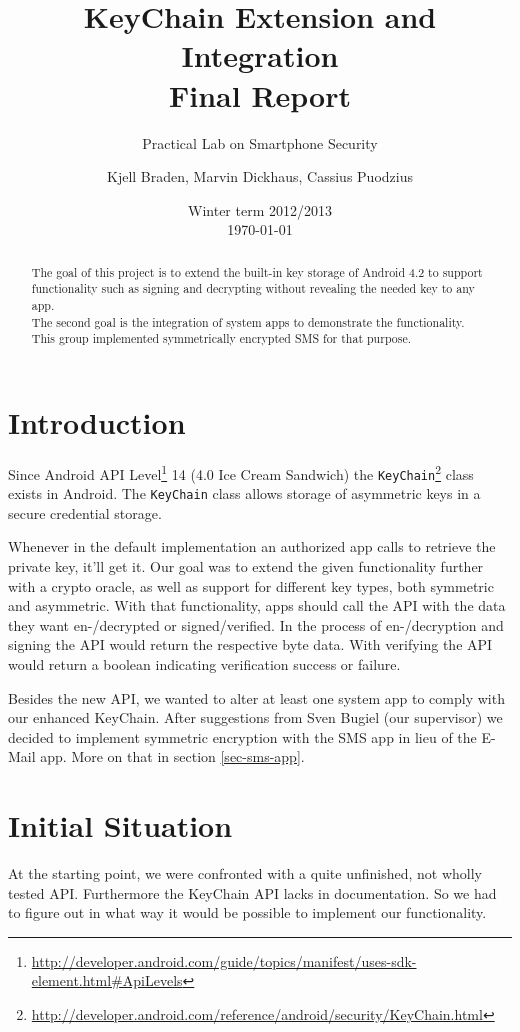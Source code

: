 \documentclass[a4paper,draft]{scrartcl}
\title{KeyChain Extension and Integration\\
	Final Report}
\subtitle{Practical Lab on Smartphone Security}
\author{Kjell Braden, Marvin Dickhaus, Cassius Puodzius}
\date{Winter term 2012/2013\\\today}
\begin{document}
\maketitle

\begin{abstract}
	The goal of this project is to extend the built-in key storage of Android 4.2 to support functionality such as signing and decrypting without revealing the needed key to any app.\\
	The second goal is the integration of system apps to demonstrate the functionality. This group implemented symmetrically encrypted SMS for that purpose.
\end{abstract}

\tableofcontents

\section{Introduction}
	Since Android API Level\footnote{\url{http://developer.android.com/guide/topics/manifest/uses-sdk-element.html\#ApiLevels}} 14 (4.0 Ice Cream Sandwich) the \texttt{KeyChain}\footnote{\url{http://developer.android.com/reference/android/security/KeyChain.html}} class exists in Android. The \texttt{KeyChain} class allows storage of asymmetric keys in a secure credential storage.

	Whenever in the default implementation an authorized app calls to retrieve the private key, it'll get it. Our goal was to extend the given functionality further with a crypto oracle, as well as support for different key types, both symmetric and asymmetric. With that functionality, apps should call the API with the data they want en-/decrypted or signed/verified. In the process of en-/decryption and signing the API would return the respective byte data. With verifying the API would return a boolean indicating verification success or failure.
	
	Besides the new API, we wanted to alter at least one system app to comply with our enhanced KeyChain. After suggestions from Sven Bugiel (our supervisor) we decided to implement symmetric encryption with the SMS app in lieu of the E-Mail app. More on that in section \ref{sec-sms-app}.

\section{Initial Situation}
	At the starting point, we were confronted with a quite unfinished, not wholly tested API. Furthermore the KeyChain API lacks in documentation. So we had to figure out in what way it would be possible to implement our functionality.
\end{document}
